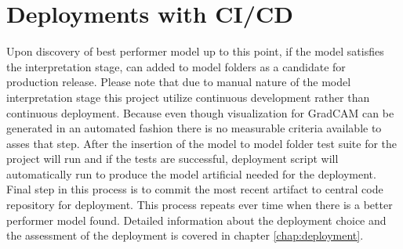 \section{Deployments with CI/CD}
Upon discovery of best performer model up to this point, if the model satisfies the interpretation stage, can added to model folders as a candidate for production release.
Please note that due to manual nature of the model interpretation stage this project utilize continuous development rather than continuous deployment.
Because even though visualization for GradCAM can be generated in an automated fashion there is no measurable criteria available to asses that step.
After the insertion of the model to model folder test suite for the project will run and if the tests are successful, deployment script will automatically run to produce the model artificial needed for the deployment.
Final step in this process is to commit the most recent artifact to central code repository for deployment.
This process repeats ever time when there is a better performer model found.
Detailed information about the deployment choice and the assessment of the deployment is covered in chapter \ref{chap:deployment}.
